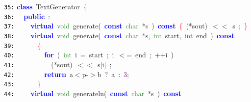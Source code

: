 \documentclass{article}
\begin{document}
\mbox{}\texttt{\textcolor{Black}{35:}} \textbf{\textcolor{Blue}{class}}\ \label{test.h:35}TextGenerator\ \textcolor{Red}{\{} \\
\mbox{}\texttt{\textcolor{Black}{36:}} \ \ \textbf{\textcolor{Blue}{public}}\ \textcolor{BrickRed}{:} \\
\mbox{}\texttt{\textcolor{Black}{37:}} \ \ \ \ \textbf{\textcolor{Blue}{virtual}}\ \textcolor{ForestGreen}{void}\ \label{test.h:37}generate\textcolor{BrickRed}{(}\ \textbf{\textcolor{Blue}{const}}\ \textcolor{ForestGreen}{char}\ \textcolor{BrickRed}{*}s\ \textcolor{BrickRed}{)}\ \textbf{\textcolor{Blue}{const}}\ \textcolor{Red}{\{}\ \textcolor{BrickRed}{(*}sout\textcolor{BrickRed}{)}\ \textcolor{BrickRed}{$<$$<$}\ s\ \textcolor{BrickRed}{;}\ \textcolor{Red}{\}} \\
\mbox{}\texttt{\textcolor{Black}{38:}} \ \ \ \ \textbf{\textcolor{Blue}{virtual}}\ \textcolor{ForestGreen}{void}\ \label{test.h:38}generate\textcolor{BrickRed}{(}\ \textbf{\textcolor{Blue}{const}}\ \textcolor{ForestGreen}{char}\ \textcolor{BrickRed}{*}s\textcolor{BrickRed}{,}\ \textcolor{ForestGreen}{int}\ start\textcolor{BrickRed}{,}\ \textcolor{ForestGreen}{int}\ end\ \textcolor{BrickRed}{)}\ \textbf{\textcolor{Blue}{const}}\  \\
\mbox{}\texttt{\textcolor{Black}{39:}} \ \ \ \ \ \ \textcolor{Red}{\{} \\
\mbox{}\texttt{\textcolor{Black}{40:}} \ \ \ \ \ \ \ \ \textbf{\textcolor{Blue}{for}}\ \textcolor{BrickRed}{(}\ \textcolor{ForestGreen}{int}\ i\ \textcolor{BrickRed}{=}\ start\ \textcolor{BrickRed}{;}\ i\ \textcolor{BrickRed}{$<$=}\ end\ \textcolor{BrickRed}{;}\ \textcolor{BrickRed}{++}i\ \textcolor{BrickRed}{)} \\
\mbox{}\texttt{\textcolor{Black}{41:}} \ \ \ \ \ \ \ \ \ \ \textcolor{BrickRed}{(*}sout\textcolor{BrickRed}{)}\ \textcolor{BrickRed}{$<$$<$}\ s\textcolor{BrickRed}{[}i\textcolor{BrickRed}{]}\ \textcolor{BrickRed}{;} \\
\mbox{}\texttt{\textcolor{Black}{42:}} \ \ \ \ \ \ \ \ \textbf{\textcolor{Blue}{return}}\ a\textcolor{BrickRed}{$<$}p\textcolor{BrickRed}{-$>$}b\ \textcolor{BrickRed}{?}\ a\ \textcolor{BrickRed}{:}\ \textcolor{Purple}{3}\textcolor{BrickRed}{;} \\
\mbox{}\texttt{\textcolor{Black}{43:}} \ \ \ \ \ \ \textcolor{Red}{\}} \\
\mbox{}\texttt{\textcolor{Black}{44:}} \ \ \ \ \textbf{\textcolor{Blue}{virtual}}\ \textcolor{ForestGreen}{void}\ \label{test.h:44}generateln\textcolor{BrickRed}{(}\ \textbf{\textcolor{Blue}{const}}\ \textcolor{ForestGreen}{char}\ \textcolor{BrickRed}{*}s\ \textcolor{BrickRed}{)}\ \textbf{\textcolor{Blue}{const}} \\
\end{document}
